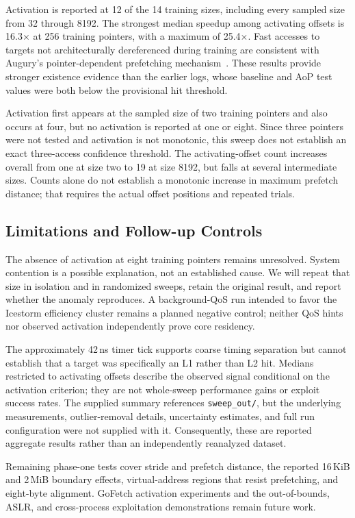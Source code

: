Activation is reported at 12 of the 14 training sizes, including every sampled size from 32 through 8192. The strongest median speedup among activating offsets is 16.3$\times$ at 256 training pointers, with a maximum of 25.4$\times$. Fast accesses to targets not architecturally dereferenced during training are consistent with Augury's pointer-dependent prefetching mechanism~\cite{augury}. These results provide stronger existence evidence than the earlier logs, whose baseline and AoP test values were both below the provisional hit threshold.

Activation first appears at the sampled size of two training pointers and also occurs at four, but no activation is reported at one or eight. Since three pointers were not tested and activation is not monotonic, this sweep does not establish an exact three-access confidence threshold. The activating-offset count increases overall from one at size two to 19 at size 8192, but falls at several intermediate sizes. Counts alone do not establish a monotonic increase in maximum prefetch distance; that requires the actual offset positions and repeated trials.

\subsection{Limitations and Follow-up Controls}
The absence of activation at eight training pointers remains unresolved. System contention is a possible explanation, not an established cause. We will repeat that size in isolation and in randomized sweeps, retain the original result, and report whether the anomaly reproduces. A background-QoS run intended to favor the Icestorm efficiency cluster remains a planned negative control; neither QoS hints nor observed activation independently prove core residency.

The approximately 42\,ns timer tick supports coarse timing separation but cannot establish that a target was specifically an L1 rather than L2 hit. Medians restricted to activating offsets describe the observed signal conditional on the activation criterion; they are not whole-sweep performance gains or exploit success rates. The supplied summary references \texttt{sweep\_out/}, but the underlying measurements, outlier-removal details, uncertainty estimates, and full run configuration were not supplied with it. Consequently, these are reported aggregate results rather than an independently reanalyzed dataset.

Remaining phase-one tests cover stride and prefetch distance, the reported 16\,KiB and 2\,MiB boundary effects, virtual-address regions that resist prefetching, and eight-byte alignment. GoFetch activation experiments and the out-of-bounds, ASLR, and cross-process exploitation demonstrations remain future work.
